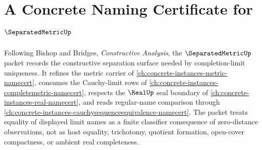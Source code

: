 \chapter{A Concrete Naming Certificate for $\SeparatedMetricUp$}
\label{ch:concrete-instances-separatedmetric-namecert}

Following Bishop and Bridges, \emph{Constructive Analysis}, the $\SeparatedMetricUp$ packet records the constructive separation surface needed by completion-limit uniqueness. It refines the metric carrier of \autoref{ch:concrete-instances-metric-namecert}, consumes the Cauchy-limit rows of \autoref{ch:concrete-instances-completemetric-namecert}, respects the $\RealUp$ seal boundary of \autoref{ch:concrete-instances-real-namecert}, and reads regular-name comparison through \autoref{ch:concrete-instances-cauchysequenceequivalence-namecert}. The packet treats equality of displayed limit names as a finite classifier consequence of zero-distance observations, not as host equality, trichotomy, quotient formation, open-cover compactness, or ambient real completeness.

